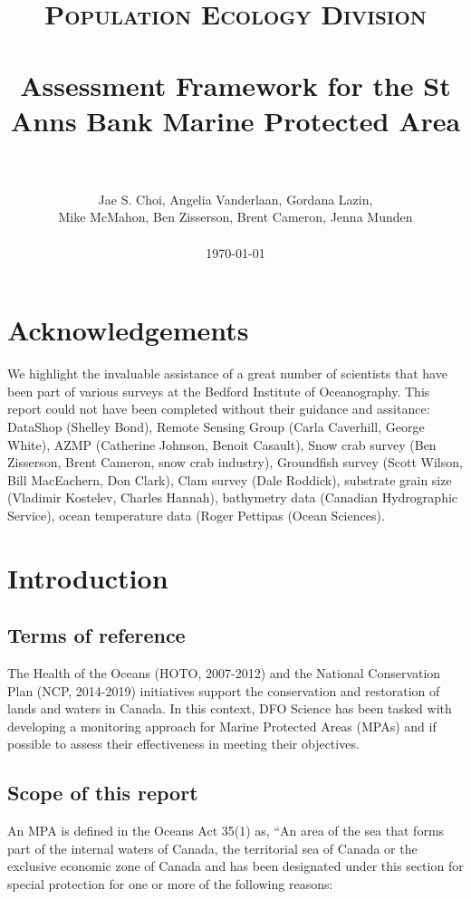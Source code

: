 \documentclass[letterpaper,portrait,12pt]{scrartcl}
\title{
		\usefont{OT1}{bch}{b}{n}
		\normalfont \normalsize \textsc{Population Ecology Division} \\ [25pt]
		\horrule{0.5pt} \\[0.4cm]
		\huge Assessment Framework for the St Anns Bank Marine Protected Area  \\
		\horrule{2pt} \\[0.5cm]
}
\author{
		\normalfont \normalsize  Jae S. Choi, Angelia Vanderlaan, Gordana Lazin, \\
    \normalfont \normalsize  Mike McMahon,  Ben Zisserson, Brent Cameron, Jenna Munden \\ 		
    \normalsize
    \\
    \today
}
\date{}
\numberwithin{equation}{section}		%
\numberwithin{figure}{section}			%
\numberwithin{table}{section}				%
\begin{document}
\maketitle


\setcounter{tocdepth}{2} %
\setcounter{secnumdepth}{3} %
\tableofcontents 
\section*{Acknowledgements}

We highlight the invaluable assistance of a great number of scientists that have been part of various surveys at the Bedford Institute of Oceanography. This report could not have been completed without their guidance and assitance: DataShop (Shelley Bond), Remote Sensing Group (Carla Caverhill, George White), AZMP (Catherine Johnson, Benoit Casault), Snow crab survey (Ben Zisserson, Brent Cameron, snow crab industry), Groundfish survey (Scott Wilson, Bill MacEachern, Don Clark), Clam survey (Dale Roddick), substrate grain size (Vladimir Kostelev, Charles Hannah), bathymetry data (Canadian Hydrographic Service), ocean temperature data (Roger Pettipas (Ocean Sciences).


\section{Introduction}
\subsection{Terms of reference}

The Health of the Oceans (HOTO, 2007-2012) and the National Conservation Plan (NCP, 2014-2019) initiatives support the conservation and restoration of lands and waters in Canada. In this context, DFO Science has been tasked with developing a monitoring approach for Marine Protected Areas (MPAs) and if possible to assess their effectiveness in meeting their objectives. 


\subsection{Scope of this report}

An MPA is defined in the Oceans Act 35(1) as, {``}An area of the sea that forms part of the internal waters of Canada, the territorial sea of Canada or the exclusive economic zone of Canada and has been designated under this section for special protection for one or more of the following reasons: 
\end{document}
